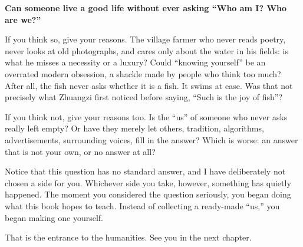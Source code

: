 \textbf{Can someone live a good life without ever asking ``Who am I? Who are we?''}

If you think so, give your reasons. The village farmer who never reads poetry, never looks at old photographs, and cares only about the water in his fields: is what he misses a necessity or a luxury? Could ``knowing yourself'' be an overrated modern obsession, a shackle made by people who think too much? After all, the fish never asks whether it is a fish. It swims at ease. Was that not precisely what Zhuangzi first noticed before saying, ``Such is the joy of fish''?

If you think not, give your reasons too. Is the ``us'' of someone who never asks really left empty? Or have they merely let others, tradition, algorithms, advertisements, surrounding voices, fill in the answer? Which is worse: an answer that is not your own, or no answer at all?

Notice that this question has no standard answer, and I have deliberately not chosen a side for you. Whichever side you take, however, something has quietly happened. The moment you considered the question seriously, you began doing what this book hopes to teach. Instead of collecting a ready-made ``us,'' you began making one yourself.

That is the entrance to the humanities. See you in the next chapter.
